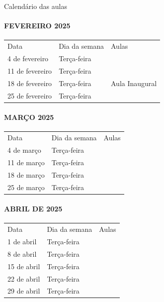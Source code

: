 \documentclass[
]{book}
\begin{document}
Calendário das aulas

\paragraph{FEVEREIRO 2025}\label{fevereiro-2025}

\begin{longtable}[]{@{}lll@{}}
\toprule\noalign{}
\endhead
\bottomrule\noalign{}
\endlastfoot
Data & Dia da semana & Aulas \\
4 de fevereiro & Terça-feira & \\
11 de fevereiro & Terça-feira & \\
18 de fevereiro & Terça-feira & Aula Inaugural \\
25 de fevereiro & Terça-feira & \\
\end{longtable}

\paragraph{MARÇO 2025}\label{maruxe7o-2025}

\begin{longtable}[]{@{}lll@{}}
\toprule\noalign{}
\endhead
\bottomrule\noalign{}
\endlastfoot
Data & Dia da semana & Aulas \\
4 de março & Terça-feira & \\
11 de março & Terça-feira & \\
18 de março & Terça-feira & \\
25 de março & Terça-feira & \\
\end{longtable}

\paragraph{ABRIL DE 2025}\label{abril-de-2025}

\begin{longtable}[]{@{}lll@{}}
\toprule\noalign{}
\endhead
\bottomrule\noalign{}
\endlastfoot
Data & Dia da semana & Aulas \\
1 de abril & Terça-feira & \\
8 de abril & Terça-feira & \\
15 de abril & Terça-feira & \\
22 de abril & Terça-feira & \\
29 de abril & Terça-feira & \\
\end{longtable}
\end{document}
